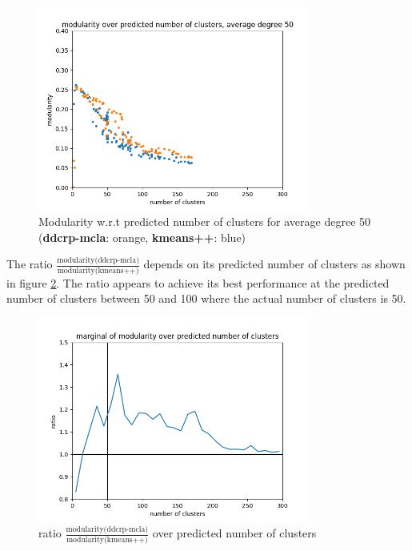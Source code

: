 \begin{figure}
    \centering
    \includegraphics[width=0.8\textwidth]{report/assets/results/modularity50.png}
    \caption{Modularity w.r.t predicted number of clusters for average degree 50 (\textbf{ddcrp-mcla}: orange, \textbf{kmeans++}: blue)}
    \label{fig:modularity50}
\end{figure}

The ratio $\frac{\text{modularity(ddcrp-mcla)}}{\text{modularity(kmeans++)}}$ depends on its predicted number of clusters as shown in figure \ref{fig:ratio_cluster}. The ratio appears to achieve its best performance at the predicted number of clusters between 50 and 100 where the actual number of clusters is 50.

\begin{figure}
    \centering
    \includegraphics[width=0.8\textwidth]{report/assets/results/ratio_cluster.png}
    \caption{ratio $\frac{\text{modularity(ddcrp-mcla)}}{\text{modularity(kmeans++)}}$ over predicted number of clusters}
    \label{fig:ratio_cluster}
\end{figure}

